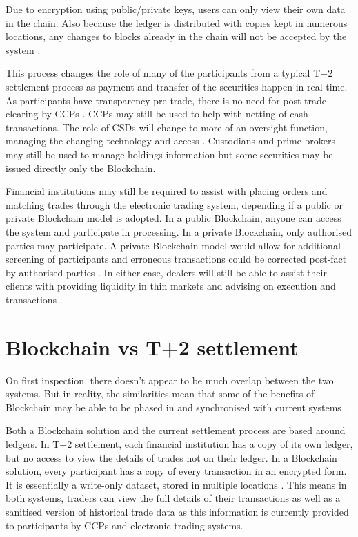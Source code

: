 \documentclass[pdftex]{article}
\begin{document}
Due to encryption using public/private keys, users can only view their own data in the chain. Also because the ledger is distributed with copies kept in numerous locations, any changes to blocks already in the chain will not be accepted by the system \cite{CaytasCU}.

This process changes the role of many of the participants from a typical T+2 settlement process as payment and transfer of the securities happen in real time. As participants have transparency pre-trade, there is no need for post-trade clearing by CCPs \cite{CaytasCU}. CCPs may still be used to help with netting of cash transactions. The role of CSDs will change to more of an oversight function, managing the changing technology and access \cite{WymanEuro}. Custodians and prime brokers may still be used to manage holdings information but some securities may be issued directly only the Blockchain.

Financial institutions may still be required to assist with placing orders and matching trades through the electronic trading system, depending if a public or private Blockchain model is adopted. In a public Blockchain, anyone can access the system and participate in processing. In a private Blockchain, only authorised parties may participate. A private Blockchain model would allow for additional screening of participants and erroneous transactions could be corrected post-fact by authorised parties \cite{gentleIntro}. In either case, dealers will still be able to assist their clients with providing liquidity in thin markets and advising on execution and transactions \cite{WymanEuro}.

\section{Blockchain vs T+2 settlement}

On first inspection, there doesn't appear to be much overlap between the two systems. But in reality, the similarities mean that some of the benefits of Blockchain may be able to be phased in and synchronised with current systems \cite{WymanEuro}.

Both a Blockchain solution and the current settlement process are based around ledgers. In T+2 settlement, each financial institution has a copy of its own ledger, but no access to view the details of trades not on their ledger. In a Blockchain solution, every participant has a copy of every transaction in an encrypted form. It is essentially a write-only dataset, stored in multiple locations \cite{gentleIntro}. This means in both systems, traders can view the full details of their transactions as well as a sanitised version of historical trade data as this information is currently provided to participants by CCPs and electronic trading systems.
\end{document}
